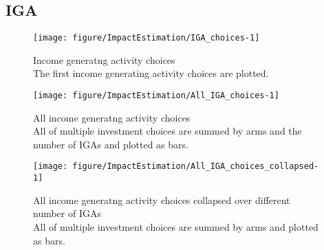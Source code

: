 \subsection{IGA}


\begin{Schunk}
\begin{figure}

{\centering \texttt{[image: figure/ImpactEstimation/IGA\_choices-1]} 

}

\caption{Income generatng activity choices\\ {\footnotesize The first income generating activity choices are plotted.\setlength{\baselineskip}{8pt}}}\label{Figure IGA choices}
\end{figure}
\end{Schunk}
\begin{Schunk}
\begin{figure}

{\centering \texttt{[image: figure/ImpactEstimation/All\_IGA\_choices-1]} 

}

\caption{All income generatng activity choices\\ {\footnotesize All of multiple investment choices are summed by arms and the number of IGAs and plotted as bars. \setlength{\baselineskip}{8pt}}}\label{Figure All IGA choices}
\end{figure}
\end{Schunk}
\begin{Schunk}
\begin{figure}

{\centering \texttt{[image: figure/ImpactEstimation/All\_IGA\_choices\_collapsed-1]} 

}

\caption{All income generatng activity choices collapsed over different number of IGAs\\ {\footnotesize All of multiple investment choices are summed by arms and plotted as bars. \setlength{\baselineskip}{8pt}}}\label{Figure All IGA choices collapsed}
\end{figure}
\end{Schunk}

